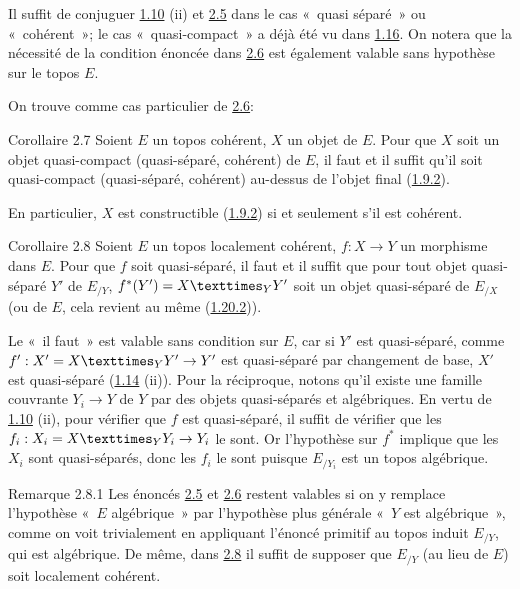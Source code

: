 \documentclass[10pt]{../fichiers-configuration-latex/smfart}
\begin{document}
Il suffit de conjuguer \hyperref[VI.prop1.10]{1.10} (ii) et \hyperref[VI.prop2.5]{2.5}
dans le cas « quasi séparé » ou « cohérent »; le cas « quasi-compact » a déjà été vu dans \hyperref[VI.cor1.16]{1.16}. On notera que
la nécessité de la condition énoncée dans \hyperref[VI.cor2.6]{2.6} est
également valable sans hypothèse sur le topos $E$.

On trouve comme cas particulier de \hyperref[VI.cor2.6]{2.6}:

\begin{enonce*}{Corollaire 2.7}
Soient $E$ un topos cohérent, $X$ un objet de $E$. Pour que $X$ soit
un objet quasi-compact (\resp quasi-séparé, \resp cohérent) de $E$, il
faut et il suffit qu'il soit quasi-compact (\resp quasi-séparé, \resp
cohérent) au-dessus de l'objet final (\hyperref[VI.subsubsec1.9.2]{1.9.2}).
\end{enonce*}

En particulier, $X$ est constructible (\hyperref[VI.subsubsec1.9.2]{1.9.2}) si et seulement s'il
est cohérent.

\begin{enonce*}{Corollaire 2.8}
Soient $E$ un topos localement cohérent, $f:X \to Y$ un morphisme dans
$E$. Pour que $f$ soit quasi-séparé, il faut et il suffit que pour
tout objet quasi-séparé $Y'$ de $E_{/Y}$, $f^{\ast} (Y') =
\fprod{X}{Y'}{Y}$ soit un objet quasi-séparé de $E_{/X}$ (ou de $E$,
cela revient au même (\hyperref[VI.subsubsec1.20.2]{1.20.2})).
\end{enonce*}

Le \pageoriginale « il faut » est valable sans condition sur $E$,
car si $Y'$ est quasi-séparé, comme $f':X'= \fprod{X}{Y'}{Y} \to Y'$ est quasi-séparé par
changement de base, $X'$ est quasi-séparé (\hyperref[VI.prop1.14]{1.14} (ii)). Pour la
réciproque, notons qu'il existe une famille couvrante $Y_i \to Y$ de
$Y$ par des objets quasi-séparés et algébriques. En vertu de \hyperref[VI.prop1.10]{1.10}
(ii), pour vérifier que $f$ est quasi-séparé, il suffit de vérifier
que les $f_i : X_i = \fprod{X}{Y_i}{Y} \to Y_i$ le sont. Or
l'hypothèse sur $f^{\ast}$ implique que les $X_i$ sont quasi-séparés,
donc les $f_i$ le sont puisque $E_{/Y_i}$ est un topos algébrique.

\begin{enonce*}[remark]{Remarque 2.8.1}
Les énoncés \hyperref[VI.prop2.5]{2.5} et \hyperref[VI.cor2.6]{2.6} restent valables si on y remplace l'hypothèse
« $E$ algébrique » par l'hypothèse plus générale « $Y$ est
algébrique », comme on voit trivialement en appliquant l'énoncé
primitif au topos induit $E_{/Y}$, qui est algébrique. De même, dans
\hyperref[VI.cor2.8]{2.8} il suffit de supposer que $E_{/Y}$ (au lieu de $E$) soit
localement cohérent.
\end{enonce*}
\end{document}
